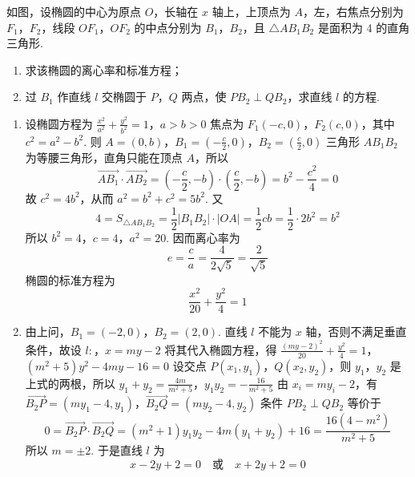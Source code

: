 \begin{problem}
如图，设椭圆的中心为原点 \(O\)，长轴在 \(x\) 轴上，上顶点为 \(A\)，左，右焦点分别为 \(F_{1}\)，\(F_{2}\)，线段 \(OF_{1}\)，\(OF_{2}\) 的中点分别为 \(B_{1}\)，\(B_{2}\)，且 \(\triangle AB_{1}B_{2}\) 是面积为 4 的直角三角形.
\begin{enumerate}
\item 求该椭圆的离心率和标准方程；
\item 过 \(B_{1}\) 作直线 \(l\) 交椭圆于 \(P\)，\(Q\) 两点，使 \(PB_{2} \perp QB_{2}\)，求直线 \(l\) 的方程.
\end{enumerate}

\begin{solution}
\begin{enumerate}
\item 设椭圆方程为
\(\frac{x^{2}}{a^{2}}+\frac{y^{2}}{b^{2}}=1\)，\(a>b>0\)
焦点为 \(F_{1}(-c,0)\)，\(F_{2}(c,0)\)，其中 \(c^{2}=a^{2}-b^{2}\). 则
\(A=(0,b)\)，\(B_{1}=\left(-\frac c2,0\right)\)，\(B_{2}=\left(\frac c2,0\right)\)
三角形 \(AB_{1}B_{2}\) 为等腰三角形，直角只能在顶点 \(A\)，所以
\[
\overrightarrow{AB_{1}}\cdot\overrightarrow{AB_{2}}
=\left(-\frac c2,-b\right)\cdot\left(\frac c2,-b\right)
=b^{2}-\frac{c^{2}}4=0
\]
故 \(c^{2}=4b^{2}\)，从而 \(a^{2}=b^{2}+c^{2}=5b^{2}\). 又
\[
4=S_{\triangle AB_{1}B_{2}}=\frac12|B_{1}B_{2}|\cdot|OA|
=\frac12 cb=\frac12\cdot2b^{2}=b^{2}
\]
所以 \(b^{2}=4\)，\(c=4\)，\(a^{2}=20\). 因而离心率为
\[
e=\frac ca=\frac4{2\sqrt5}=\frac2{\sqrt5}
\]
椭圆的标准方程为
\[
\frac{x^{2}}{20}+\frac{y^{2}}4=1
\]

\item 由上问，\(B_{1}=(-2,0)\)，\(B_{2}=(2,0)\). 直线 \(l\) 不能为 \(x\) 轴，否则不满足垂直条件，故设
\(l:\)，\(x=my-2\)
将其代入椭圆方程，得
\(\frac{(my-2)^{2}}{20}+\frac{y^{2}}4=1\)，\((m^{2}+5)y^{2}-4my-16=0\)
设交点 \(P(x_{1},y_{1})\)，\(Q(x_{2},y_{2})\)，则 \(y_{1}\)，\(y_{2}\) 是上式的两根，所以
\(y_{1}+y_{2}=\frac{4m}{m^{2}+5}\)，\(y_{1}y_{2}=-\frac{16}{m^{2}+5}\)
由 \(x_{i}=my_{i}-2\)，有
\(\overrightarrow{B_{2}P}=(my_{1}-4,y_{1})\)，\(\overrightarrow{B_{2}Q}=(my_{2}-4,y_{2})\)
条件 \(PB_{2}\perp QB_{2}\) 等价于
\[
0=\overrightarrow{B_{2}P}\cdot\overrightarrow{B_{2}Q}
=(m^{2}+1)y_{1}y_{2}-4m(y_{1}+y_{2})+16
=\frac{16(4-m^{2})}{m^{2}+5}
\]
所以 \(m=\pm2\). 于是直线 \(l\) 为
\[
x-2y+2=0\quad\text{或}\quad x+2y+2=0
\]
\end{enumerate}
\end{solution}
\end{problem}

